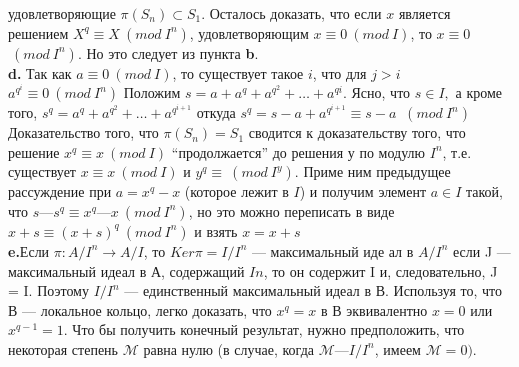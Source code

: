 удовлетворяющие $\pi(S_n) \subset S_1$. Осталось доказать, что если $x$ является
решением $X^{q} \equiv X ~(mod~ I^{n})$, удовлетворяющим $x \equiv 0 ~(mod~ I)$, то $x \equiv 0$
$~(mod~ I^{n})$. Но это следует из пункта \textbf{b}.\\
\hspace*{15pt}\textbf{d.} Так как $a \equiv 0 ~(mod~ I)$, то существует такое $i$, что для $j > i$\linebreak
$a^{q^{i}} \equiv0 ~(mod~ I^{n})$ Положим $s = a + a^{q} + a^{q^{2}} +\ldots+ a^{q{i}}$. Ясно, что $s \in I,$\linebreak
а кроме того, $s^{q} = a^{q}+ a^{q^{2}} +\ldots+ a^{q^{i+1}}$ откуда $s^{q} = s - a + a^{q^{i+1}} \equiv s - a$\linebreak
$~(mod~ I^{n})$\\
\hspace*{15pt}Доказательство того, что $\pi(S_n) = S_1$ сводится к доказательству
того, что решение $x^{q} \equiv x ~(mod~ I)$ “продолжается” до решения у по
модулю $I^{n}$, т.е. существует $x \equiv x ~(mod~ I)$ и $y^{q} \equiv ~(mod~ I^{y} )$. Приме­
ним предыдущее рассуждение при $a = x^{q} - x$ (которое лежит в $I$) и
получим элемент $a \in I$ такой, что $s — s^{q} \equiv x^{q} — x ~(mod~ I^{n})$, но это
можно переписать в виде $x + s \equiv (x + s)^{q} ~(mod~ I^{n})$ и взять $x = x + s$\\
\hspace*{15pt}\textbf{e.}Если $\pi : A/I^{n} \rightarrow A/I$, то $Ker\pi = I/I^{n}$ --- максимальный иде­
ал в $A/I^{n}$ если J — максимальный идеал в А, содержащий $I{n}$, то он
содержит I и, следовательно, J = I. Поэтому $I/I^{n}$ --- единственный
максимальный идеал в В. Используя то, что В — локальное кольцо,
легко доказать, что $x^{q} = x$ в В эквивалентно $x = 0$ или $x^{q-1} = 1$. Что­
бы получить конечный результат, нужно предположить, что некоторая
степень $\mathcal{M}$ равна нулю (в случае, когда $\mathcal{M} — I/I^{n}$, имеем $\mathcal{M} = 0)$.
\newpage
%
